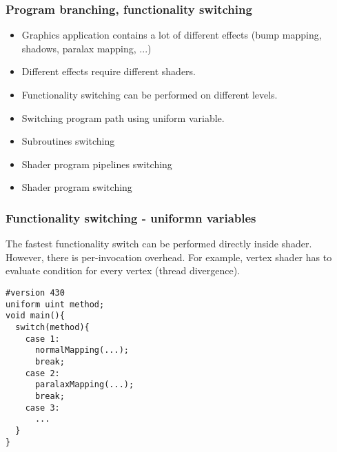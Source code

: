 
\begin{frame}[fragile]
\frametitle{Program branching, functionality switching}
  \begin{itemize}
    \item Graphics application contains a lot of different effects (bump mapping, shadows, paralax mapping, ...)
    \item Different effects require different shaders.
    \item Functionality switching can be performed on different levels.
    \item Switching program path using uniform variable.
    \item Subroutines switching
    \item Shader program pipelines switching
    \item Shader program switching
  \end{itemize}
\end{frame}

\begin{frame}[fragile]
\frametitle{Functionality switching - uniformn variables}
  The fastest functionality switch can be performed directly inside shader.
  However, there is per-invocation overhead.
  For example, vertex shader has to evaluate condition for every vertex (thread divergence).
{\scriptsize
\begin{verbatim}
#version 430
uniform uint method;
void main(){
  switch(method){
    case 1:
      normalMapping(...);
      break;
    case 2:
      paralaxMapping(...);
      break;
    case 3:
      ...
  }
}
\end{verbatim}
}
\end{frame}

